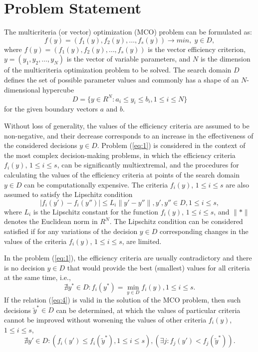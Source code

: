 \documentclass[smallextended]{svjour3}       %
\begin{document}
\section{Problem Statement}
\label{sec:2}

The multicriteria (or vector) optimization (MCO) problem can be formulated as:
\begin{equation}\label{eq:1}
f(y) = (f_1(y), f_2(y), \dots , f_s(y)) \to min, \; y \in D,
\end{equation}
where $f(y) = (f_1(y),f_2(y),\dots,f_s(y))$  is the vector efficiency criterion, $y = (y_1,y_2,\dots,y_N)$ is the vector of variable parameters, and $N$ is the dimension of the multicriteria optimization problem to be solved. The search domain $D$ defines the set of possible parameter values and commonly has a shape of an $N$-dimensional hypercube
\begin{equation}\label{eq:2}
D  = \{ y\in R^N: a_i \leq y_i \leq b_i, 1 \leq i \leq N \}
\end{equation}
for the given boundary vectors $a$ and $b$.

Without loss of generality, the values of the efficiency criteria are assumed to be non-negative, and their decrease corresponds to an increase in the effectiveness of the considered decisions $y \in D$. Problem (\ref{eq:1}) is considered in the context of the most complex decision-making problems, in which the efficiency criteria $f_i(y)$, $1 \leq i \leq s$, can be significantly multiextremal, and the procedures for calculating the values of the efficiency criteria at points of the search domain $y \in D$ can be computationally expensive. The criteria $f_i (y)$, $1 \leq i \leq s$ are also assumed to satisfy the Lipschitz condition
\begin{equation}\label{eq:3}
|f_i (y')-f_i (y'')| \leq L_i \|y'-y''\|, y',y''\in D, 1 \leq i \leq s,
\end{equation}
where $L_i$ is the Lipschitz constant for the function $f_i(y)$, $1 \leq i \leq s$, and ${\|*\|}$ denotes the Euclidean norm in $R^N$. The Lipschitz condition can be considered satisfied if for any variations of the decision $y \in D$ corresponding changes in the values of the criteria $f_i(y)$, $1 \leq i \leq s$, are limited.

In the problem (\ref{eq:1}), the efficiency criteria are usually contradictory and there is no decision $y \in D$ that would provide the best (smallest) values for all criteria at the same time, i.e.,
\begin{equation}\label{eq:4}
\nexists y^*\in D: f_i(y^*) = \min_{y \in D} {f_i (y)} , 1 \leq i \leq s.
\end{equation}
If the relation (\ref{eq:4}) is valid in the solution of the MCO problem, then such decisions $\widetilde{y}^* \in D$ can be determined, at which the values of particular criteria cannot be improved without worsening the values of other criteria $f_i(y)$, $1 \leq i \leq s$,
\begin{equation}\label{eq:5}
\nexists y'\in D: (f_i(y') \leq f_i(\widetilde{y}^*), 1 \leq i \leq s), (\exists j: f_j(y') < f_j(\widetilde{y}^*)).
\end{equation}
\end{document}
